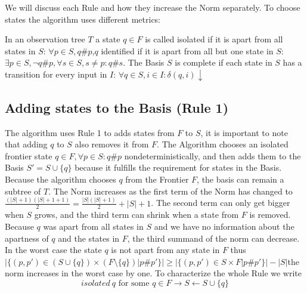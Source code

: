 We will discuss each Rule and how they increase the Norm separately. 
To choose states the algorithm uses different metrics:
\begin{definition}\label{def:isolated}
	In an observation tree $T$ a state $q\in F$ is called isolated if it is apart from all states in $S$: $\forall p\in S, q\#p$,$q$ identified if it is apart from all but one state in $S$: $\exists p\in S, \neg q\#p, \forall s\in S, s\neq p: q\#s$. The Basis $S$ is complete if each state in $S$ has a transition for every input in $I$: $\forall q\in S, i\in I: \delta(q,i)\downarrow$
\end{definition}

\subsection{Adding states to the Basis (Rule 1)}

The algorithm uses Rule 1 to adds states from $F$ to $S$, it is important to note that adding $q$ to $S$ also removes it from $F$. 
 The Algorithm chooses an isolated frontier state $q\in F, \forall p\in S: q\#p$ nondeterministically, and then adds them to the Basis $S'=S\cup\{q\}$ because it fulfills the requirement for states in the Basis. Because the algorithm chooses $q$ from the Frontier $F$, the basis can remain a subtree of $T$. The Norm increases as the first term of the Norm has changed to $\frac{(|S|+1)(|S|+1+1)}{2}=\frac{|S|(|S|+1)}{2}+|S|+1$. The second term can only get bigger when $S$ grows, and the third term can shrink when a state from $F$ is removed. Because $q$ was apart from all states in $S$ and we have no information about the apartness of $q$ and the states in $F$, the third summand of the norm can decrease. In the worst case the state $q$ is not apart from any state in $F$ thus $|\{(p,p')\in (S\cup \{q\})\times (F\setminus \{q\})| p\#p'\}|\geq |\{(p,p')\in S\times F| p\#p'\}|-|S|$the norm increases in the worst case by one. To characterize the whole Rule we write $$
isolated\: q \text{ for some } q\in F \rightarrow S\leftarrow S\cup\{q\}
$$ 

